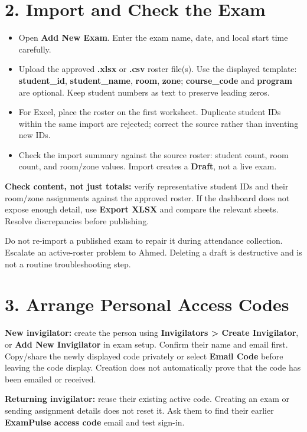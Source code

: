 \documentclass[10pt,a4paper]{article}
\begin{document}
\section*{2. Import and Check the Exam}
\begin{itemize}\item[1.] Open \textbf{Add New Exam}. Enter the exam name, date, and local start time carefully.\end{itemize}
\begin{itemize}\item[2.] Upload the approved \textbf{.xlsx} or \textbf{.csv} roster file(s). Use the displayed template: \textbf{student\_id}, \textbf{student\_name}, \textbf{room}, \textbf{zone}; \textbf{course\_code} and \textbf{program} are optional. Keep student numbers as text to preserve leading zeros.\end{itemize}
\begin{itemize}\item[3.] For Excel, place the roster on the first worksheet. Duplicate student IDs within the same import are rejected; correct the source rather than inventing new IDs.\end{itemize}
\begin{itemize}\item[4.] Check the import summary against the source roster: student count, room count, and room/zone values. Import creates a \textbf{Draft}, not a live exam.\end{itemize}
\textbf{Check content, not just totals:} verify representative student IDs and their room/zone assignments against the approved roster. If the dashboard does not expose enough detail, use \textbf{Export XLSX} and compare the relevant sheets. Resolve discrepancies before publishing.\par
Do not re-import a published exam to repair it during attendance collection. Escalate an active-roster problem to Ahmed. Deleting a draft is destructive and is not a routine troubleshooting step.\par
\section*{3. Arrange Personal Access Codes}
\textbf{New invigilator:} create the person using \textbf{Invigilators > Create Invigilator}, or \textbf{Add New Invigilator} in exam setup. Confirm their name and email first. Copy/share the newly displayed code privately or select \textbf{Email Code} before leaving the code display. Creation does not automatically prove that the code has been emailed or received.\par
\textbf{Returning invigilator:} reuse their existing active code. Creating an exam or sending assignment details does not reset it. Ask them to find their earlier \textbf{ExamPulse access code} email and test sign-in.\par
\newpage
\end{document}
